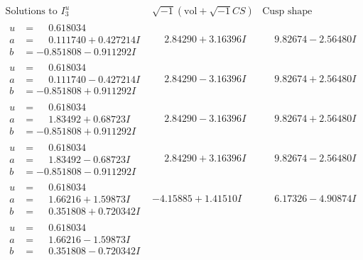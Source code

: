 \documentclass[1p]{elsarticle_modified}
\theoremstyle{definition}
\newcommand{\I}{\sqrt{-1}}
\begin{document}
$$\begin{array}{c|c|c}  
\text{Solutions to }I^u_{3}& \I (\text{vol} + \sqrt{-1}CS) & \text{Cusp shape}\\
 \hline 
\begin{aligned}
u &= \phantom{-}0.618034\phantom{ +0.000000I} \\
a &= \phantom{-}0.111740 + 0.427214 I \\
b &= -0.851808 - 0.911292 I\end{aligned}
 & \phantom{-}2.84290 + 3.16396 I & \phantom{-}9.82674 - 2.56480 I \\ \hline\begin{aligned}
u &= \phantom{-}0.618034\phantom{ +0.000000I} \\
a &= \phantom{-}0.111740 - 0.427214 I \\
b &= -0.851808 + 0.911292 I\end{aligned}
 & \phantom{-}2.84290 - 3.16396 I & \phantom{-}9.82674 + 2.56480 I \\ \hline\begin{aligned}
u &= \phantom{-}0.618034\phantom{ +0.000000I} \\
a &= \phantom{-}1.83492 + 0.68723 I \\
b &= -0.851808 + 0.911292 I\end{aligned}
 & \phantom{-}2.84290 - 3.16396 I & \phantom{-}9.82674 + 2.56480 I \\ \hline\begin{aligned}
u &= \phantom{-}0.618034\phantom{ +0.000000I} \\
a &= \phantom{-}1.83492 - 0.68723 I \\
b &= -0.851808 - 0.911292 I\end{aligned}
 & \phantom{-}2.84290 + 3.16396 I & \phantom{-}9.82674 - 2.56480 I \\ \hline\begin{aligned}
u &= \phantom{-}0.618034\phantom{ +0.000000I} \\
a &= \phantom{-}1.66216 + 1.59873 I \\
b &= \phantom{-}0.351808 + 0.720342 I\end{aligned}
 & -4.15885 + 1.41510 I & \phantom{-}6.17326 - 4.90874 I \\ \hline\begin{aligned}
u &= \phantom{-}0.618034\phantom{ +0.000000I} \\
a &= \phantom{-}1.66216 - 1.59873 I \\
b &= \phantom{-}0.351808 - 0.720342 I\end{aligned}

\end{array}$$
\end{document}
